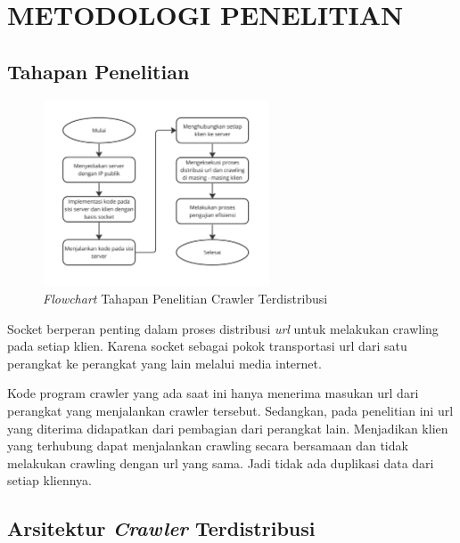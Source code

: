 
\chapter{METODOLOGI PENELITIAN}

\section{Tahapan Penelitian}

\begin{figure}[H]
  \centering{}
	\includegraphics[width=0.6\textwidth]{gambar/flowchart_tahapan_penelitian_crawler_terdistribusi}
  \caption{\emph{Flowchart} Tahapan Penelitian Crawler Terdistribusi}
\end{figure}

Socket berperan penting dalam proses distribusi \emph{url} untuk melakukan crawling pada setiap klien. Karena socket sebagai pokok transportasi url dari satu perangkat ke perangkat yang lain melalui media internet.

Kode program crawler yang ada saat ini hanya menerima masukan url dari perangkat yang menjalankan crawler tersebut. Sedangkan, pada penelitian ini url yang diterima didapatkan dari pembagian dari perangkat lain. Menjadikan klien yang terhubung dapat menjalankan crawling secara bersamaan dan tidak melakukan crawling dengan url yang sama. Jadi tidak ada duplikasi data dari setiap kliennya.

\section{Arsitektur \emph{Crawler} Terdistribusi}

